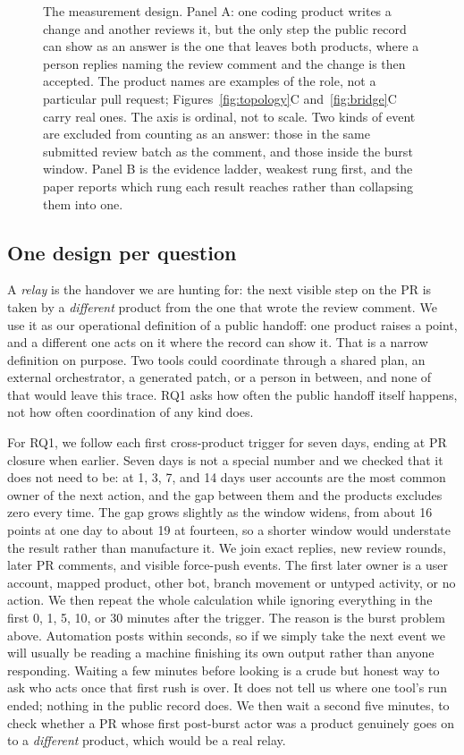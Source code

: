 \documentclass[lineno,pdflatex,sn-basic]{sn-jnl}
\begin{document}
\begin{figure}[htbp]
\centering

\caption{The measurement design. Panel A: one coding product writes a change and
another reviews it, but the only step the public record can show as an answer is
the one that leaves both products, where a person replies naming the review
comment and the change is then accepted. The product names are examples of the
role, not a particular pull request; Figures~\ref{fig:topology}C
and~\ref{fig:bridge}C carry real ones. The axis is ordinal, not to scale. Two
kinds of event are excluded from counting as an answer: those in the same
submitted review batch as the comment, and those inside the burst window. Panel B
is the evidence ladder, weakest rung first, and the paper reports which rung each
result reaches rather than collapsing them into one.}
\label{fig:contract}
\end{figure}

\subsection{One design per question}

A \emph{relay} is the handover we are hunting for: the next visible step on the
PR is taken by a \emph{different} product from the one that wrote the review
comment. We use it as our operational definition of a public handoff: one product raises a
point, and a different one acts on it where the record can show it. That is a
narrow definition on purpose. Two tools could coordinate through a shared plan,
an external orchestrator, a generated patch, or a person in between, and none of
that would leave this trace. RQ1 asks how often the public handoff itself
happens, not how often coordination of any kind does.

For RQ1, we follow each first cross-product trigger for seven days, ending at
PR closure when earlier. Seven days is not a special number and we checked that it
does not need to be: at 1, 3, 7, and 14 days user accounts are the most common
owner of the next action, and the gap between them and the products excludes zero
every time. The gap grows slightly as the window widens, from about 16 points at
one day to about 19 at fourteen, so a shorter window would understate the result
rather than manufacture it. We join exact replies, new review rounds, later PR
comments, and visible force-push events. The first later owner is a user
account, mapped product, other bot, branch movement or untyped activity, or no
action. We then repeat the whole calculation while ignoring everything in the first 0, 1,
5, 10, or 30 minutes after the trigger. The reason is the burst problem above.
Automation posts within seconds, so if we simply take the next event we will
usually be reading a machine finishing its own output rather than anyone
responding. Waiting a few minutes before looking is a crude but honest way to ask
who acts once that first rush is over. It does not tell us where one tool's run
ended; nothing in the public record does. We then wait a second five minutes, to
check whether a PR whose first post-burst actor was a product genuinely goes on to
a \emph{different} product, which would be a real relay.
\end{document}
